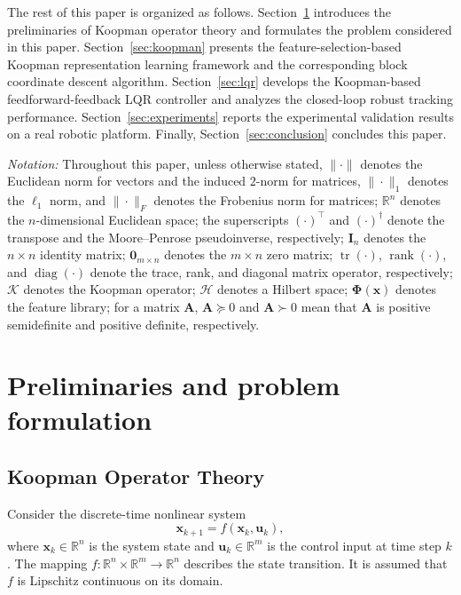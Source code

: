 \documentclass[final,3p,twocolumn,times]{elsarticle}
\newcommand{\R}{\mathbb{R}}
\newcommand{\x}{\mathbf{x}}
\newcommand{\uvec}{\mathbf{u}}
\newcommand{\I}{\mathbf{I}}
\newcommand{\Phib}{\boldsymbol{\Phi}}
\DeclareMathOperator{\tr}{tr}
\DeclareMathOperator{\rank}{rank}
\DeclareMathOperator{\diag}{diag}
\begin{document}
The rest of this paper is organized as follows. Section~\ref{sec:background}
introduces the preliminaries of Koopman operator theory and formulates the
problem considered in this paper. Section~\ref{sec:koopman} presents the
feature-selection-based Koopman representation learning framework and the
corresponding block coordinate descent algorithm. Section~\ref{sec:lqr}
develops the Koopman-based feedforward-feedback LQR controller and analyzes
the closed-loop robust tracking performance. Section~\ref{sec:experiments}
reports the experimental validation results on a real robotic platform.
Finally, Section~\ref{sec:conclusion} concludes this paper.

\textit{Notation:} Throughout this paper, unless otherwise stated,
$\|\cdot\|$ denotes the Euclidean norm for vectors and the induced $2$-norm
for matrices, $\|\cdot\|_1$ denotes the $\ell_1$ norm, and $\|\cdot\|_F$
denotes the Frobenius norm for matrices; $\mathbb{R}^n$ denotes the
$n$-dimensional Euclidean space; the superscripts $(\cdot)^\top$ and
$(\cdot)^\dagger$ denote the transpose and the Moore--Penrose pseudoinverse,
respectively; $\I_n$ denotes the $n \times n$ identity matrix;
$\mathbf{0}_{m \times n}$ denotes the $m \times n$ zero matrix;
$\tr(\cdot)$, $\rank(\cdot)$, and $\diag(\cdot)$ denote the trace, rank, and
diagonal matrix operator, respectively; $\mathcal{K}$ denotes the Koopman
operator; $\mathcal{H}$ denotes a Hilbert space; $\Phib(\x)$ denotes the
feature library; for a matrix $\mathbf{A}$, $\mathbf{A} \succeq 0$ and
$\mathbf{A} \succ 0$ mean that $\mathbf{A}$ is positive semidefinite and
positive definite, respectively.


\section{Preliminaries and problem formulation}
\label{sec:background}

\subsection{Koopman Operator Theory}
\label{subsec:koopman_theory}

Consider the discrete-time nonlinear system
\begin{equation}
\x_{k+1} = f(\x_k, \uvec_k),
\end{equation}
where $\x_k \in \R^n$ is the system state and $\uvec_k \in \R^m$ is the control input at time step $k$. The mapping $f: \R^n \times \R^m \to \R^n$ describes the state transition. It is assumed that $f$ is Lipschitz continuous on its domain.
\end{document}

